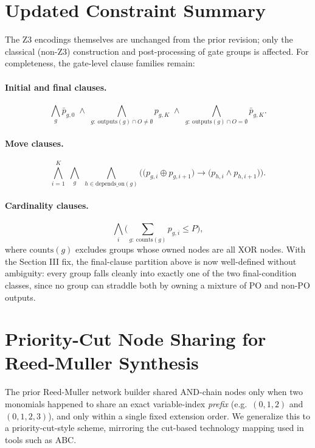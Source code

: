 \documentclass[conference]{IEEEtran}
\begin{document}
\section{Updated Constraint Summary}

The Z3 encodings themselves are unchanged from the prior revision;
only the classical (non-Z3) construction and post-processing of gate
groups is affected. For completeness, the gate-level clause families
remain:

\paragraph{Initial and final clauses.}
\begin{equation}
\bigwedge_{g} \bar p_{g,0}
\;\wedge\;
\bigwedge_{g:\ \mathrm{outputs}(g)\cap O\ne\emptyset} p_{g,K}
\;\wedge\;
\bigwedge_{g:\ \mathrm{outputs}(g)\cap O=\emptyset} \bar p_{g,K}.
\end{equation}

\paragraph{Move clauses.}
\begin{equation}
\bigwedge_{i=1}^{K}\;\bigwedge_{g}\;\bigwedge_{h\in\mathrm{depends\_on}(g)}
\Big(\big(p_{g,i}\oplus p_{g,i+1}\big) \rightarrow
\big(p_{h,i}\wedge p_{h,i+1}\big)\Big).
\end{equation}

\paragraph{Cardinality clauses.}
\begin{equation}
\bigwedge_{i}\Big(\sum_{g:\ \mathrm{counts}(g)} p_{g,i} \le P\Big),
\end{equation}
where $\mathrm{counts}(g)$ excludes groups whose owned nodes are all
XOR nodes. With the Section III fix, the final-clause partition above
is now well-defined without ambiguity: every group falls cleanly into
exactly one of the two final-condition classes, since no group can
straddle both by owning a mixture of PO and non-PO outputs.

\section{Priority-Cut Node Sharing for Reed-Muller Synthesis}

The prior Reed-Muller network builder shared AND-chain nodes only when
two monomials happened to share an exact variable-index \emph{prefix}
(e.g.\ $(0,1,2)$ and $(0,1,2,3)$), and only within a single fixed
extension order. We generalize this to a priority-cut-style scheme,
mirroring the cut-based technology mapping used in tools such as ABC.
\end{document}
